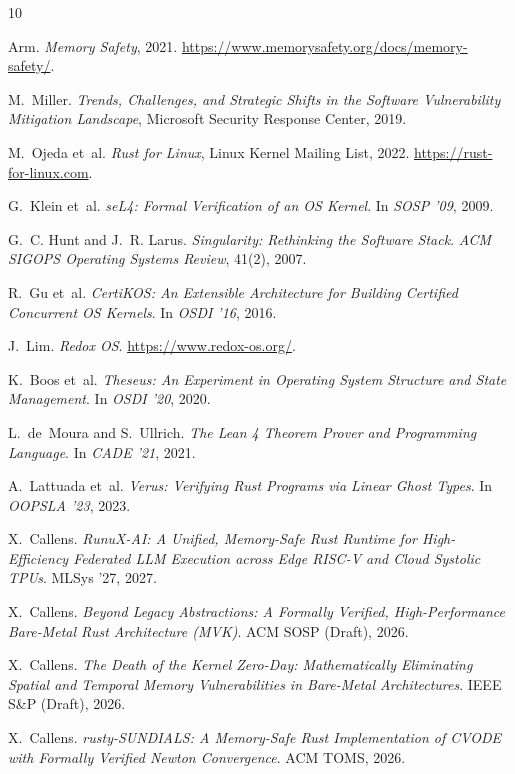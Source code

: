 \documentclass[sigconf,nonacm=false]{acmart}
\begin{document}

\begin{thebibliography}{10}

Arm. \emph{Memory Safety}, 2021. \url{https://www.memorysafety.org/docs/memory-safety/}.

M.~Miller. \emph{Trends, Challenges, and Strategic Shifts in the Software Vulnerability Mitigation Landscape}, Microsoft Security Response Center, 2019.

M.~Ojeda et~al. \emph{Rust for Linux}, Linux Kernel Mailing List, 2022. \url{https://rust-for-linux.com}.

G.~Klein et~al. \emph{seL4: Formal Verification of an OS Kernel}. In \emph{SOSP '09}, 2009.

G.~C. Hunt and J.~R. Larus. \emph{Singularity: Rethinking the Software Stack}. \emph{ACM SIGOPS Operating Systems Review}, 41(2), 2007.

R.~Gu et~al. \emph{CertiKOS: An Extensible Architecture for Building Certified Concurrent OS Kernels}. In \emph{OSDI '16}, 2016.

J.~Lim. \emph{Redox OS}. \url{https://www.redox-os.org/}.

K.~Boos et~al. \emph{Theseus: An Experiment in Operating System Structure and State Management}. In \emph{OSDI '20}, 2020.

L.~de~Moura and S.~Ullrich. \emph{The Lean 4 Theorem Prover and Programming Language}. In \emph{CADE '21}, 2021.

A.~Lattuada et~al. \emph{Verus: Verifying Rust Programs via Linear Ghost Types}. In \emph{OOPSLA '23}, 2023.

X.~Callens. \emph{RunuX-AI: A Unified, Memory-Safe Rust Runtime for High-Efficiency Federated LLM Execution across Edge RISC-V and Cloud Systolic TPUs}. MLSys '27, 2027.

X.~Callens. \emph{Beyond Legacy Abstractions: A Formally Verified, High-Performance Bare-Metal Rust Architecture (MVK)}. ACM SOSP (Draft), 2026.

X.~Callens. \emph{The Death of the Kernel Zero-Day: Mathematically Eliminating Spatial and Temporal Memory Vulnerabilities in Bare-Metal Architectures}. IEEE S\&P (Draft), 2026.

X.~Callens. \emph{rusty-SUNDIALS: A Memory-Safe Rust Implementation of CVODE with Formally Verified Newton Convergence}. ACM TOMS, 2026.

\end{thebibliography}
\end{document}
